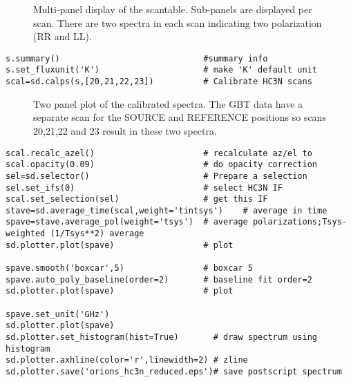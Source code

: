 \begin{figure}[h!]
\caption{\label{fig:scantable} Multi-panel display of the
  scantable. Sub-panels are displayed per scan. There are two 
  spectra in each scan indicating two polarization (RR and LL).} 
\hrulefill
\end{figure}
 
\small
\begin{verbatim}
s.summary()                             #summary info                                   
s.set_fluxunit('K')                     # make 'K' default unit
scal=sd.calps(s,[20,21,22,23])          # Calibrate HC3N scans                          
\end{verbatim}
\normalsize

\begin{figure}[h!]
\caption{\label{fig:scal} Two panel plot of the calibrated
  spectra. The GBT data have a separate scan for the SOURCE and
  REFERENCE positions so scans 20,21,22 and 23 result in these two
  spectra.} 
\hrulefill
\end{figure}

\small
\begin{verbatim}
scal.recalc_azel()                      # recalculate az/el to                          
scal.opacity(0.09)                      # do opacity correction                         
sel=sd.selector()                       # Prepare a selection
sel.set_ifs(0)                          # select HC3N IF
scal.set_selection(sel)                 # get this IF
stave=sd.average_time(scal,weight='tintsys')    # average in time
spave=stave.average_pol(weight='tsys')  # average polarizations;Tsys-weighted (1/Tsys**2) average
sd.plotter.plot(spave)                  # plot

spave.smooth('boxcar',5)                # boxcar 5                                      
spave.auto_poly_baseline(order=2)       # baseline fit order=2                          
sd.plotter.plot(spave)                  # plot                                          

spave.set_unit('GHz')                                                                   
sd.plotter.plot(spave)
sd.plotter.set_histogram(hist=True)       # draw spectrum using histogram                 
sd.plotter.axhline(color='r',linewidth=2) # zline                                       
sd.plotter.save('orions_hc3n_reduced.eps')# save postscript spectrum                    
\end{verbatim}
\normalsize

